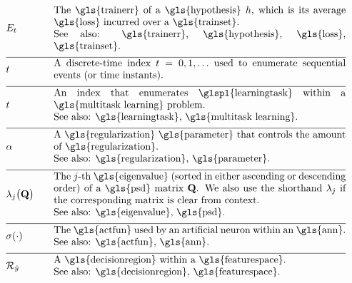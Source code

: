 \begin{align}                          
	&\trainerror &\quad &\parbox{.85\textwidth}{The \gls{trainerr} of a \gls{hypothesis} $\hypothesis$, which is its 
		average \gls{loss} incurred over a \gls{trainset}.
		\\ See also: \gls{trainerr}, \gls{hypothesis}, \gls{loss}, \gls{trainset}. }\nonumber \\[2mm] \hline \nonumber\\[-5mm]
	&\timeidx &\quad &\parbox{.85\textwidth}{A discrete-time index $\timeidx=0,1,\ldots$ used to 
		enumerate sequential events (or time instants). }\nonumber \\[2mm] \hline \nonumber\\[-5mm]
	&\taskidx &\quad &\parbox{.85\textwidth}{An index that enumerates
		\glspl{learningtask} within a \gls{multitask learning} problem.
		\\ See also: \gls{learningtask}, \gls{multitask learning}. }\nonumber \\[2mm] \hline \nonumber\\[-5mm]
	&\regparam &\quad &\parbox{.85\textwidth}{A \gls{regularization} \gls{parameter} that controls 
		the amount of \gls{regularization}.
		\\ See also: \gls{regularization}, \gls{parameter}. } \nonumber \\[2mm] \hline \nonumber\\[-5mm]
	&\eigval{\featureidx}\big( \mathbf{Q} \big) &\quad &\parbox{.85\textwidth}{The $\featureidx$-th 
		\gls{eigenvalue} (sorted in either ascending or descending order) of a \gls{psd} matrix $\mathbf{Q}$. We also 
		use the shorthand $\eigval{\featureidx}$ if the corresponding matrix is clear from context.
		\\ See also: \gls{eigenvalue}, \gls{psd}. }\nonumber \\[2mm] \hline \nonumber\\[-5mm]
	&\actfun(\cdot) &\quad &\parbox{.85\textwidth}{The \gls{actfun} used by an artificial neuron within an \gls{ann}.
		\\ See also: \gls{actfun}, \gls{ann}. }\nonumber \\[2mm] \hline \nonumber\\[-5mm]
	&\decreg{\hat{\truelabel}} &\quad &\parbox{.85\textwidth}{A \gls{decisionregion} within a \gls{featurespace}.
		\\ See also: \gls{decisionregion}, \gls{featurespace}. }\nonumber
\end{align}     

